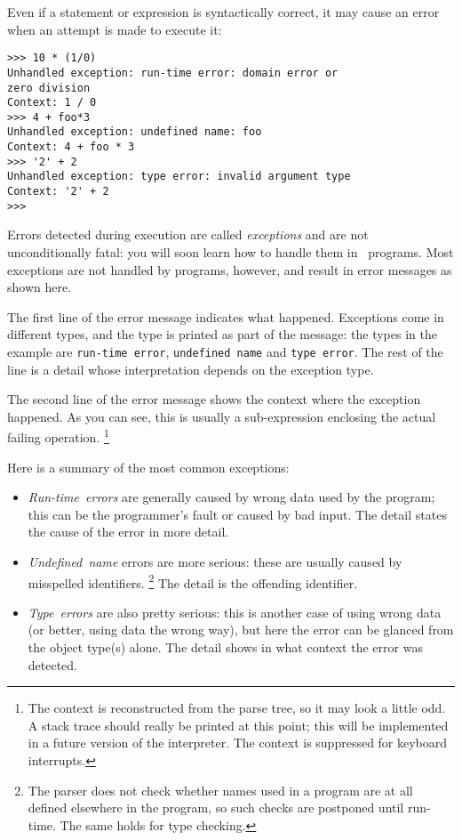 Even if a statement or expression is syntactically correct, it may cause
an error when an attempt is made to execute it:
\begin{code}\begin{verbatim}
>>> 10 * (1/0)
Unhandled exception: run-time error: domain error or
zero division
Context: 1 / 0 
>>> 4 + foo*3
Unhandled exception: undefined name: foo
Context: 4 + foo * 3 
>>> '2' + 2
Unhandled exception: type error: invalid argument type
Context: '2' + 2 
>>> 
\end{verbatim}\end{code}
Errors detected during execution are called
{\it exceptions}
and are not unconditionally fatal: you will soon learn how to handle
them in \Python\ programs.
Most exceptions are not handled by programs, however, and result
in error messages as shown here.

The first line of the error message indicates what happened.
Exceptions come in different types, and the type is printed as part of
the message: the types in the example are
{\tt run-time error},
{\tt undefined name}
and
{\tt type error}.
The rest of the line is a detail whose interpretation depends on the
exception type.

The second line of the error message shows the context where the
exception happened.
As you can see, this is usually a sub-expression enclosing the actual
failing operation.%
\footnote{
	The context is reconstructed from the parse tree, so it may look
	a little odd.  A stack trace should really be printed at this
	point; this will be implemented in a future version of the
	interpreter.  The context is suppressed for keyboard interrupts.
}

Here is a summary of the most common exceptions:
\begin{itemize}
\item
{\it Run-time\ errors}
are generally caused by wrong data used by the program; this can be the
programmer's fault or caused by bad input.
The detail states the cause of the error in more detail.
\item
{\it Undefined\ name}
errors are more serious: these are usually caused by misspelled
identifiers.%
\footnote{
	The parser does not check whether names used in a program are at
	all defined elsewhere in the program, so such checks are
	postponed until run-time.  The same holds for type checking.
}
The detail is the offending identifier.
\item
{\it Type\ errors}
are also pretty serious: this is another case of using wrong data (or
better, using data the wrong way), but here the error can be glanced
from the object type(s) alone.
The detail shows in what context the error was detected.
\end{itemize}

